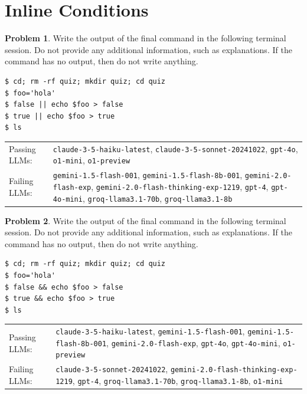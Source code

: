 \documentclass[10pt]{article}
\theoremstyle{definition}
\newtheorem{problem}{Problem}
\begin{document}
\noindent\vspace{0.1in}\begin{minipage}{\textwidth}
\section{Inline Conditions}

\begin{problem}
Write the output of the final command in the following terminal session.
Do not provide any additional information,
such as explanations.
If the command has no output,
then do not write anything.

\end{problem}
\begin{lstlisting}
$ cd; rm -rf quiz; mkdir quiz; cd quiz
$ foo='hola'
$ false || echo $foo > false
$ true || echo $foo > true
$ ls
\end{lstlisting}


\noindent
\begin{tabular}{p{1.0in}L{5in}}
Passing LLMs: & {\lstinline$claude-3-5-haiku-latest$}, {\lstinline$claude-3-5-sonnet-20241022$}, {\lstinline$gpt-4o$}, {\lstinline$o1-mini$}, {\lstinline$o1-preview$} \\
Failing LLMs: & {\lstinline$gemini-1.5-flash-001$}, {\lstinline$gemini-1.5-flash-8b-001$}, {\lstinline$gemini-2.0-flash-exp$}, {\lstinline$gemini-2.0-flash-thinking-exp-1219$}, {\lstinline$gpt-4$}, {\lstinline$gpt-4o-mini$}, {\lstinline$groq-llama3.1-70b$}, {\lstinline$groq-llama3.1-8b$} \\
\end{tabular}

\end{minipage}
\noindent\vspace{0.1in}\begin{minipage}{\textwidth}

\begin{problem}
Write the output of the final command in the following terminal session.
Do not provide any additional information,
such as explanations.
If the command has no output,
then do not write anything.

\end{problem}
\begin{lstlisting}
$ cd; rm -rf quiz; mkdir quiz; cd quiz
$ foo='hola'
$ false && echo $foo > false
$ true && echo $foo > true
$ ls
\end{lstlisting}


\noindent
\begin{tabular}{p{1.0in}L{5in}}
Passing LLMs: & {\lstinline$claude-3-5-haiku-latest$}, {\lstinline$gemini-1.5-flash-001$}, {\lstinline$gemini-1.5-flash-8b-001$}, {\lstinline$gemini-2.0-flash-exp$}, {\lstinline$gpt-4o$}, {\lstinline$gpt-4o-mini$}, {\lstinline$o1-preview$} \\
Failing LLMs: & {\lstinline$claude-3-5-sonnet-20241022$}, {\lstinline$gemini-2.0-flash-thinking-exp-1219$}, {\lstinline$gpt-4$}, {\lstinline$groq-llama3.1-70b$}, {\lstinline$groq-llama3.1-8b$}, {\lstinline$o1-mini$} \\
\end{tabular}

\end{minipage}
\end{document}
